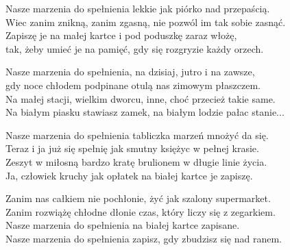 \begin{text}
    Nasze marzenia do spełnienia lekkie jak piórko nad przepaścią.\\
    Wiec zanim znikną, zanim zgasną, nie pozwól im tak sobie zasnąć.\\
    Zapiszę je na małej kartce i pod poduszkę zaraz włożę,\\
    tak, żeby umieć je na pamięć, gdy się rozgryzie każdy orzech.

    Nasze marzenia do spełnienia, na dzisiaj, jutro i na zawsze,\\
    gdy noce chłodem podpinane otulą nas zimowym płaszczem.\\
    Na małej stacji, wielkim dworcu, inne, choć przecież takie same.\\
    Na białym piasku stawiasz zamek, na białym lodzie pałac stanie...

    Nasze marzenia do spełnienia tabliczka marzeń mnożyć da się.\\
    Teraz i ja już się spełnię jak smutny księżyc w pełnej krasie.\\
    Zeszyt w miłosną bardzo kratę brulionem w długie linie życia.\\
    Ja, człowiek kruchy jak opłatek na białej kartce je zapiszę.

    Zanim nas całkiem nie pochłonie, żyć jak szalony supermarket.\\
    Zanim rozwiążę chłodne dłonie czas, który liczy się z zegarkiem.\\
    Nasze marzenia do spełnienia na białej kartce zapisane.\\
    Nasze marzenia do spełnienia zapisz, gdy zbudzisz się nad ranem.
\end{text}
\begin{chord}

\end{chord}